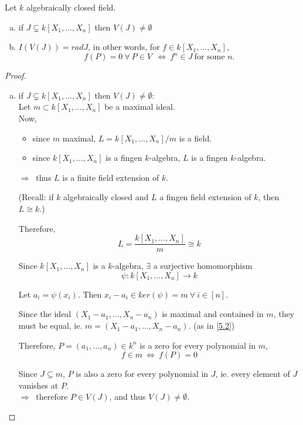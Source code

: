 \documentclass{article}
\theoremstyle{definition}
\newenvironment{thm}[1]
{\renewcommand\theinnerthm{#1}\innerthm}
{\endinnerthm}
\begin{document}
\vspace{0.5cm}
\begin{thm}{5.6}[Nullstellensatz] \label{nullstellensatz}
  Let $k$ algebraically closed field.

  \begin{enumerate}[a.]
    \item if $J \subsetneq k[X_1, \ldots, X_n]$ then $V(J) \neq \emptyset$
    \item $I(V(J)) = rad J$, in other words, for $f \in k[X_1, \ldots, X_n]$,
      $$f(P)=0 ~\forall~ P \in V ~~\Longleftrightarrow~ f^n \in J ~\text{for some $n$.}$$
  \end{enumerate}
\end{thm}
\begin{proof}
  \begin{enumerate}[a.]
    \item if $J \subsetneq k[X_1, \ldots, X_n]$ then $V(J) \neq \emptyset$:\\
  Let $m \subset k[X_1, \ldots, X_n]$ be a maximal ideal.\\

  Now,
  \begin{itemize}
    \item[-] since $m$ maximal, $L= k[X_1, \ldots, X_n]/m$ is a field.
    \item[-] since $k[X_1, \ldots, X_n]$ is a fingen $k$-algebra, $L$ is a fingen $k$-algebra.
  \end{itemize}
  $\Longrightarrow~$ thus $L$ is a finite field extension of $k$.

  (Recall: if $k$ algebraically closed and $L$ a fingen field extension of $k$,
  then $L \cong k$.)

  Therefore,
  $$L=\frac{k[X_1, \ldots, X_n]}{m} \cong k$$

  Since $k[X_1, \ldots, X_n]$ is a $k$-algebra, $\exists$ a surjective homomorphism
  $$\psi: k[X_1, \ldots, X_n] \longrightarrow k$$

  Let $a_i = \psi(x_i)$. Then $x_i - a_i \in ker(\psi) = m ~\forall~ i \in [n]$.

  Since the ideal $(X_1 - a_1, \ldots, X_n - a_n)$ is maximal and contained in $m$, they must be equal, ie. $m = (X_1 - a_1, \ldots, X_n - a_n)$. (as in \ref{5.2})

  Therefore, $P=(a_1, \ldots, a_n) \in k^n$ is a zero for every polynomial in $m$,
  $$f \in m ~\Longleftrightarrow~ f(P)=0$$

  Since $J \subseteq m$, $P$ is also a zero for every polynomial in $J$, ie. every element of $J$ vanishes at $P$.\\
  $\Longrightarrow~$ therefore $P \in V(J)$, and thus $V(J) \neq \emptyset$.


\end{enumerate}
\end{proof}
\end{document}

